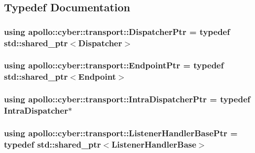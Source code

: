 \subsection{Typedef Documentation}
\hypertarget{namespaceapollo_1_1cyber_1_1transport_abba04e3e93745dd7020da6aa697cf165}{
\subsubsection[{Dispatcher\-Ptr}]{\setlength{\rightskip}{0pt plus 5cm}using {\bf apollo\-::cyber\-::transport\-::\-Dispatcher\-Ptr} = typedef std\-::shared\-\_\-ptr$<${\bf Dispatcher}$>$}}\label{namespaceapollo_1_1cyber_1_1transport_abba04e3e93745dd7020da6aa697cf165}
\hypertarget{namespaceapollo_1_1cyber_1_1transport_ad38e6aae033358e75827d6b4ac75caf8}{
\subsubsection[{Endpoint\-Ptr}]{\setlength{\rightskip}{0pt plus 5cm}using {\bf apollo\-::cyber\-::transport\-::\-Endpoint\-Ptr} = typedef std\-::shared\-\_\-ptr$<${\bf Endpoint}$>$}}\label{namespaceapollo_1_1cyber_1_1transport_ad38e6aae033358e75827d6b4ac75caf8}
\hypertarget{namespaceapollo_1_1cyber_1_1transport_af059bf179d7ece8cb6ee52f0157568de}{
\subsubsection[{Intra\-Dispatcher\-Ptr}]{\setlength{\rightskip}{0pt plus 5cm}using {\bf apollo\-::cyber\-::transport\-::\-Intra\-Dispatcher\-Ptr} = typedef {\bf Intra\-Dispatcher}$\ast$}}\label{namespaceapollo_1_1cyber_1_1transport_af059bf179d7ece8cb6ee52f0157568de}
\hypertarget{namespaceapollo_1_1cyber_1_1transport_a7748946e9ae4f2e24a82aadd4f02d3b6}{
\subsubsection[{Listener\-Handler\-Base\-Ptr}]{\setlength{\rightskip}{0pt plus 5cm}using {\bf apollo\-::cyber\-::transport\-::\-Listener\-Handler\-Base\-Ptr} = typedef std\-::shared\-\_\-ptr$<${\bf Listener\-Handler\-Base}$>$}}\label{namespaceapollo_1_1cyber_1_1transport_a7748946e9ae4f2e24a82aadd4f02d3b6}
